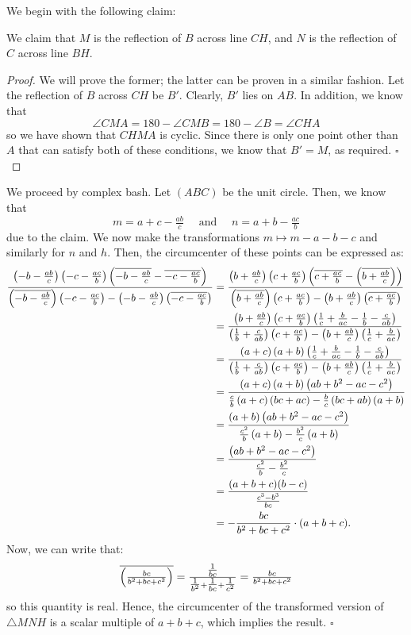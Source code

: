 \documentclass{article}
\begin{document}
We begin with the following claim:
\begin{claim*}
We claim that $M$ is the reflection of $B$ across line $CH$, and $N$ is the reflection of $C$ across line $BH$.
\end{claim*}
\begin{proof}
We will prove the former; the latter can be proven in a similar fashion. Let the reflection of $B$ across $CH$ be $B'$. Clearly, $B'$ lies on $AB$. In addition, we know that \[\angle CMA = 180-\angle CMB = 180-\angle B = \angle CHA\] so we have shown that $CHMA$ is cyclic. Since there is only one point other than $A$ that can satisfy both of these conditions, we know that $B' = M$, as required. $\square$
\end{proof}

We proceed by complex bash. Let $(ABC)$ be the unit circle. Then, we know that \[m = a+c-\tfrac{ab}{c} \quad \text{ and } \quad n = a+b-\tfrac{ac}{b}\] due to the claim. We now make the transformations $m \mapsto m-a-b-c$ and similarly for $n$ and $h$. Then, the circumcenter of these points can be expressed as:
{\allowdisplaybreaks
\begin{align*}
\dfrac{\left(-b-\tfrac{ab}{c}\right)\left(-c-\tfrac{ac}{b}\right)\left(\overline{-b-\tfrac{ab}{c}}-\overline{-c-\tfrac{ac}{b}}\right)}{\left(\overline{-b-\tfrac{ab}{c}}\right)\left(-c-\tfrac{ac}{b}\right)-\left(-b-\tfrac{ab}{c}\right)\left(\overline{-c-\tfrac{ac}{b}}\right)} &= \dfrac{\left(b+\tfrac{ab}{c}\right)\left(c+\tfrac{ac}{b}\right)\left(\overline{c+\tfrac{ac}{b}}-\left(\overline{b+\tfrac{ab}{c}}\right)\right)}{\left(\overline{b+\tfrac{ab}{c}}\right)\left(c+\tfrac{ac}{b}\right)-\left(b+\tfrac{ab}{c}\right)\left(\overline{c+\tfrac{ac}{b}}\right)} \\
&= \dfrac{\left(b+\tfrac{ab}{c}\right)\left(c+\tfrac{ac}{b}\right)\left(\tfrac{1}{c}+\tfrac{b}{ac}-\tfrac{1}{b}-\tfrac{c}{ab}\right)}{\left(\tfrac{1}{b}+\tfrac{c}{ab}\right)\left(c+\tfrac{ac}{b}\right)-\left(b+\tfrac{ab}{c}\right)\left(\tfrac{1}{c}+\tfrac{b}{ac}\right)} \\
&= \dfrac{\left(a+c\right)\left(a+b\right)\left(\tfrac{1}{c}+\tfrac{b}{ac}-\tfrac{1}{b}-\tfrac{c}{ab}\right)}{\left(\tfrac{1}{b}+\tfrac{c}{ab}\right)\left(c+\tfrac{ac}{b}\right)-\left(b+\tfrac{ab}{c}\right)\left(\tfrac{1}{c}+\tfrac{b}{ac}\right)} \\
&= \dfrac{\left(a+c\right)\left(a+b\right)\left(ab+b^2-ac-c^2\right)}{\tfrac{c}{b}\left(a+c\right)\left(bc+ac\right)-\tfrac{b}{c}\left(bc+ab\right)\left(a+b\right)} \\
&= \dfrac{\left(a+b\right)\left(ab+b^2-ac-c^2\right)}{\tfrac{c^2}{b}\left(a+b\right)-\tfrac{b^2}{c}\left(a+b\right)} \\
&= \dfrac{\left(ab+b^2-ac-c^2\right)}{\tfrac{c^2}{b}-\tfrac{b^2}{c}} \\
&= \dfrac{(a+b+c)(b-c)}{\tfrac{c^3-b^3}{bc}} \\
&= -\dfrac{bc}{b^2+bc+c^2}\cdot(a+b+c).
\end{align*}
}
Now, we can write that: \[\overline{\left(\tfrac{bc}{b^2+bc+c^2}\right)} = \tfrac{\tfrac{1}{bc}}{\tfrac{1}{b^2}+\tfrac{1}{bc}+\tfrac{1}{c^2}} = \tfrac{bc}{b^2+bc+c^2}\] so this quantity is real. Hence, the circumcenter of the transformed version of $\triangle MNH$ is a scalar multiple of $a+b+c$, which implies the result. $\square$
\end{document}
